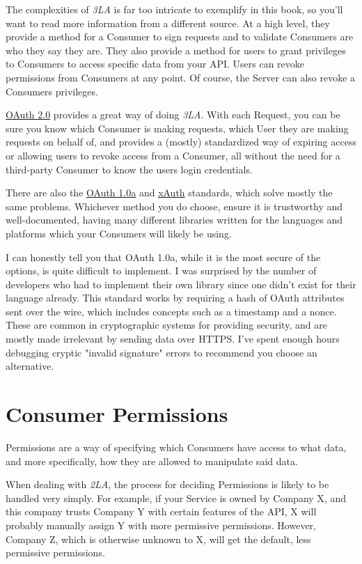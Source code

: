 \documentclass{book}
\begin{document}
The complexities of \emph{3LA} is far too intricate to exemplify in this book, so you'll want to read more information from a different source. At a high level, they provide a method for a Consumer to sign requests and to validate Consumers are who they say they are. They also provide a method for users to grant privileges to Consumers to access specific data from your API. Users can revoke permissions from Consumers at any point. Of course, the Server can also revoke a Consumers privileges.

\href{https://tools.ietf.org/html/rfc6749}{OAuth 2.0} provides a great way of doing \emph{3LA}. With each Request, you can be sure you know which Consumer is making requests, which User they are making requests on behalf of, and provides a (mostly) standardized way of expiring access or allowing users to revoke access from a Consumer, all without the need for a third-party Consumer to know the users login credentials.

There are also the \href{http://tools.ietf.org/html/rfc5849}{OAuth 1.0a} and \href{https://dev.twitter.com/docs/oauth/xauth}{xAuth} standards, which solve mostly the same problems. Whichever method you do choose, ensure it is trustworthy and well-documented, having many different libraries written for the languages and platforms which your Consumers will likely be using.

I can honestly tell you that OAuth 1.0a, while it is the most secure of the options, is quite difficult to implement. I was surprised by the number of developers who had to implement their own library since one didn't exist for their language already. This standard works by requiring a hash of OAuth attributes sent over the wire, which includes concepts such as a timestamp and a nonce. These are common in cryptographic systems for providing security, and are mostly made irrelevant by sending data over HTTPS. I've spent enough hours debugging cryptic "invalid signature" errors to recommend you choose an alternative.


\section{Consumer Permissions}

Permissions are a way of specifying which Consumers have access to what data, and more specifically, how they are allowed to manipulate said data.

When dealing with \emph{2LA}, the process for deciding Permissions is likely to be handled very simply. For example, if your Service is owned by Company X, and this company trusts Company Y with certain features of the API, X will probably manually assign Y with more permissive permissions. However, Company Z, which is otherwise unknown to X, will get the default, less permissive permissions.
\end{document}
